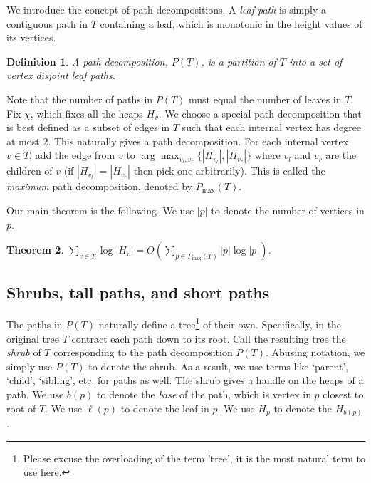 \documentclass[11pt]{article}
\newtheorem{theorem}{Theorem}
\newtheorem{definition}[theorem]{Definition}
\theoremstyle{definition}
\newcommand{\Lem}[1]{\hyperref[lem:#1]{Lemma~\ref*{lem:#1}}} %
\newcommand{\cost}{\mathop{cost}}
\newcommand{\pmax}{P_{\max}}
\begin{document}
We introduce the concept of path decompositions. A \emph{leaf path} is simply a contiguous path in $T$
containing a leaf, which is monotonic in the height values of its vertices.

\begin{definition}
\label{def:path} A \emph{path decomposition}, $P(T)$, is a partition of $T$ into 
 a set of vertex disjoint leaf paths.  
% 
\end{definition}

Note that the number of paths in $P(T)$ must equal the number of leaves in $T$.
Fix $\chi$, which fixes all the heaps $H_v$. We choose a special path decomposition that is best defined as a subset of edges in $T$ such that each internal
vertex has degree at most $2$. This naturally gives a path decomposition.
For each internal vertex $v\in T$, add the edge from $v$ to $\arg \max_{v_l, v_r} \{|H_{v_l}|, |H_{v_r}|\}$ 
 where $v_l$ and $v_r$ are the children of $v$ (if $|H_{v_l}|=|H_{v_r}|$ then pick one arbitrarily).
This is called the \emph{maximum} path decomposition, denoted by $\pmax(T)$.

Our main theorem is the following. We use $|p|$ to denote the number of vertices in $p$.

\begin{theorem} \label{thm:runtime} $\sum_{v \in T} \log |H_v| = O(\sum_{p\in \pmax(T)} |p| \log |p|)$.
\end{theorem}


\subsection{Shrubs, tall paths, and short paths}


The paths in $P(T)$ naturally define a tree\footnote{Please excuse the 
overloading of the term 'tree', it is the most natural term to use here.} of their own.  Specifically, in the original 
tree $T$ contract each path down to its root.  Call the resulting tree the \emph{shrub} of $T$ corresponding to 
the path decomposition $P(T)$. Abusing notation, we simply use $P(T)$ to denote the shrub.
As a result, we use terms like `parent', `child', `sibling', etc. for paths as well.
The shrub gives a handle on the heaps of a path.
We use $b(p)$ to denote the \emph{base} of the path, which is vertex in $p$ closest
to root of $T$. We use $\ell(p)$ to denote the leaf in $p$.
We use $H_p$ to denote the $H_{b(p)}$.
\end{document}
